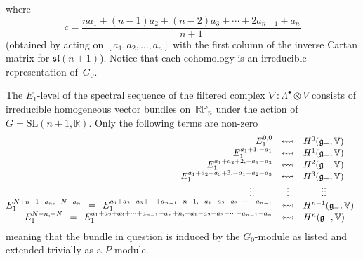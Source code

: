 \documentclass[pdftex]{sigma}
\begin{document}
where
\[c=\frac{na_1+(n-1)a_2+(n-2)a_3+\cdots+2a_{n-1}+a_n}{n+1}\]
(obtained by acting on $[a_1,a_2,\dots,a_n]$ with the f\/irst column of the
inverse Cartan matrix for ${\mathfrak{sl}}(n+1)$). Notice that each cohomology
is an irreducible representation of~$G_0$.

\begin{theorem}\label{E1level}
The $E_1$-level of the spectral sequence of the filtered complex
$\nabla:\Lambda^\bullet\otimes V$ consists of irreducible homogeneous vector
bundles on~${\mathbb{RP}}_n$ under the action of
$G={\mathrm{SL}}(n+1,{\mathbb{R}})$. Only the following terms are non-zero
\[\begin{array}{@{}rcl}
E_1^{0,0}&\leftrightsquigarrow&H^0({\mathfrak{g}}_-,{\mathbb{V}})\\
E_1^{a_1+1,-a_1}&\leftrightsquigarrow&H^1({\mathfrak{g}}_-,{\mathbb{V}})\\
E_1^{a_1+a_2+2,-a_1-a_2}&\leftrightsquigarrow&
H^2({\mathfrak{g}}_-,{\mathbb{V}})\\
E_1^{a_1+a_2+a_3+3,-a_1-a_2-a_3}&\leftrightsquigarrow&
H^3({\mathfrak{g}}_-,{\mathbb{V}})\\
\vdots\vdots\hspace*{20pt}&\vdots&\hspace*{20pt}\vdots\vdots\\
E_1^{N+n-1-a_n,-N+a_n}\enskip=\enskip
E_1^{a_1+a_2+a_3+\cdots+a_{n-1}+n-1,-a_1-a_2-a_3-\cdots-a_{n-1}}
&\leftrightsquigarrow&
H^{n-1}({\mathfrak{g}}_-,{\mathbb{V}})\\
E_1^{N+n,-N}\enskip=\enskip
E_1^{a_1+a_2+a_3+\cdots+a_{n-1}+a_n+n,-a_1-a_2-a_3-\cdots-a_{n-1}-a_n}
&\leftrightsquigarrow&
H^n({\mathfrak{g}}_-,{\mathbb{V}})
\end{array}\]
meaning that the bundle in question is induced by the $G_0$-module as listed
and extended trivially as a $P$-module.
\end{theorem}
\end{document}
